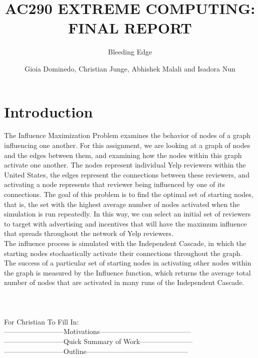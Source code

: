 \documentclass[11pt]{scrartcl} %
\title{AC290 EXTREME COMPUTING: FINAL REPORT}
\subtitle{Bleeding Edge}
\author{Gioia Dominedo, Christian Junge, Abhishek Malali and Isadora Nun}
\begin{document}
\setcounter{secnumdepth}{0}
\maketitle
\setlength{\parindent}{5ex}

\section{Introduction}

The Influence Maximization Problem examines the behavior of nodes of a graph influencing one another.  For this assignment, we are looking at a graph of nodes and the edges between them, and examining how the nodes within this graph activate one another.  The nodes represent individual Yelp reviewers within the United States, the edges represent the connections between these reviewers, and activating a node represents that reviewer being influenced by one of its connections.  The goal of this problem is to find the optimal set of starting nodes, that is, the set with the highest average number of nodes activated when the simulation is run repeatedly.  In this way, we can select an initial set of reviewers to target with advertising and incentives that will have the maximum influence that spreads throughout the network of Yelp reviewers.  \\

The influence process is simulated with the Independent Cascade, in which the starting nodes stochastically activate their connections throughout the graph.  The success of a particular set of starting nodes in activating other nodes within the graph is measured by the Influence function, which returns the average total number of nodes that are activated in many runs of the Independent Cascade.  \\
\\
\\
\\
For Christian To Fill In:\\
--------------------------Motivations---------------------------------------\\
--------------------------Quick Summary of Work-----------------------\\
--------------------------Outline--------------------------------------------\\
\\
\end{document}

